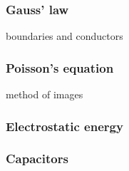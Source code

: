 \documentclass{article}
\begin{document}
\begin{multicols*}{3}
\subsubsection*{Gauss' law}
boundaries and conductors

\subsubsection*{Poisson's equation}
method of images

\subsubsection*{Electrostatic energy}

\subsubsection*{Capacitors}

\end{multicols*}
\end{document}
